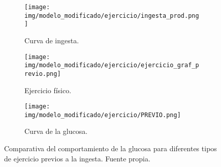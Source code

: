 \begin{figure}[htbp]
    \centering
    \begin{subfigure}[b]{0.9\linewidth} %
        \centering
        \texttt{[image: img/modelo\_modificado/ejercicio/ingesta\_prod.png]}
        \caption{Curva de ingesta.}
    \end{subfigure}
    
    \vspace{0.5cm} %

    \begin{subfigure}[b]{0.9\linewidth} %
        \centering
        \texttt{[image: img/modelo\_modificado/ejercicio/ejercicio\_graf\_previo.png]}
        \caption{Ejercicio físico.}
    \end{subfigure}
    
    \vspace{0.5cm} %

    \begin{subfigure}[b]{0.9\linewidth} %
        \centering
        \texttt{[image: img/modelo\_modificado/ejercicio/PREVIO.png]}
        \caption{Curva de la glucosa.}
    \end{subfigure}
    
    \caption{Comparativa del comportamiento de la glucosa para diferentes tipos de ejercicio previos a la ingesta. Fuente propia.}
    \label{fig:ej_antes}
\end{figure}

